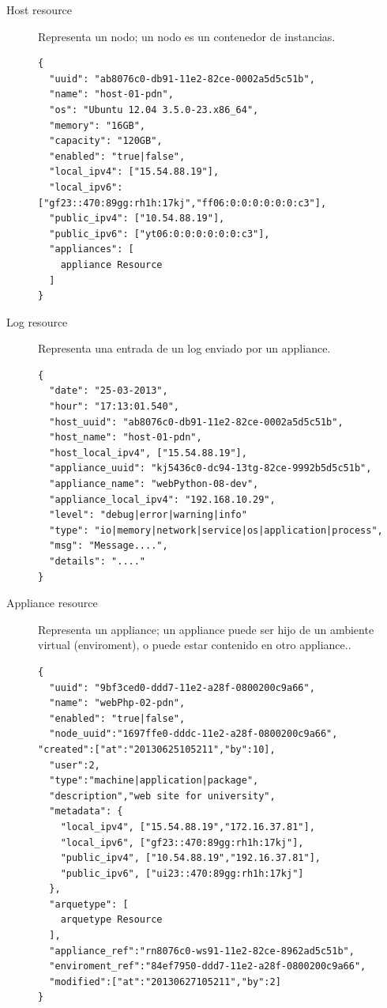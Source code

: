 \begin{description}
\item [Host resource] Representa un nodo; un nodo es un contenedor de instancias.

\medskip
\begin{lstlisting}
{
  "uuid": "ab8076c0-db91-11e2-82ce-0002a5d5c51b",
  "name": "host-01-pdn",
  "os": "Ubuntu 12.04 3.5.0-23.x86_64",
  "memory": "16GB",
  "capacity": "120GB",
  "enabled": "true|false",
  "local_ipv4": ["15.54.88.19"],
  "local_ipv6": ["gf23::470:89gg:rh1h:17kj","ff06:0:0:0:0:0:0:c3"],
  "public_ipv4": ["10.54.88.19"],
  "public_ipv6": ["yt06:0:0:0:0:0:0:c3"],  
  "appliances": [
    appliance Resource
  ]
}
\end{lstlisting}

\item [Log resource] Representa una entrada de un log enviado por un appliance. 

\medskip
\begin{lstlisting}
{
  "date": "25-03-2013",
  "hour": "17:13:01.540",
  "host_uuid": "ab8076c0-db91-11e2-82ce-0002a5d5c51b",
  "host_name": "host-01-pdn",
  "host_local_ipv4", ["15.54.88.19"],
  "appliance_uuid": "kj5436c0-dc94-13tg-82ce-9992b5d5c51b",
  "appliance_name": "webPython-08-dev",
  "appliance_local_ipv4": "192.168.10.29",
  "level": "debug|error|warning|info"
  "type": "io|memory|network|service|os|application|process",
  "msg": "Message....",
  "details": "...."
}
\end{lstlisting}

\item [Appliance resource] Representa un appliance; un appliance puede ser hijo de un ambiente virtual (enviroment), o puede estar contenido en otro appliance..

\medskip
\begin{lstlisting}
{
  "uuid": "9bf3ced0-ddd7-11e2-a28f-0800200c9a66",
  "name": "webPhp-02-pdn",
  "enabled": "true|false",
  "node_uuid":"1697ffe0-dddc-11e2-a28f-0800200c9a66",  "created":["at":"20130625105211","by":10],
  "user":2,
  "type":"machine|application|package",
  "description","web site for university",  
  "metadata": {
	"local_ipv4", ["15.54.88.19","172.16.37.81"],
	"local_ipv6", ["gf23::470:89gg:rh1h:17kj"], 
	"public_ipv4", ["10.54.88.19","192.16.37.81"],
	"public_ipv6", ["ui23::470:89gg:rh1h:17kj"]
  },
  "arquetype": [
    arquetype Resource
  ],
  "appliance_ref":"rn8076c0-ws91-11e2-82ce-8962ad5c51b",
  "enviroment_ref":"84ef7950-ddd7-11e2-a28f-0800200c9a66",
  "modified":["at":"20130627105211","by":2]
}
\end{lstlisting}


\end{description}
